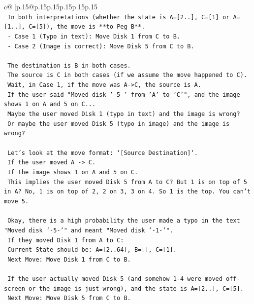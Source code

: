 \documentclass{article}
\begin{document}
{\begin{supertabular}{c@{$\;$}|p{.15\linewidth}@{}p{.15\linewidth}p{.15\linewidth}p{.15\linewidth}p{.15\linewidth}p{.15\linewidth}}
{{{\\ 
\texttt{    In both interpretations (whether the state is A={[}2..{]}, C={[}1{]} or A={[}1..{]}, C={[}5{]}), the move is **to Peg B**.} \\
\texttt{    {-} Case 1 (Typo in text): Move Disk 1 from C to B.} \\
\texttt{    {-} Case 2 (Image is correct): Move Disk 5 from C to B.} \\
\\ 
\texttt{    The destination is B in both cases.} \\
\texttt{    The source is C in both cases (if we assume the move happened to C).} \\
\texttt{    Wait, in Case 1, if the move was A{-}>C, the source is A.} \\
\texttt{    If the user said "Moved disk '{-}5{-}' from 'A' to 'C'", and the image shows 1 on A and 5 on C...} \\
\texttt{    Maybe the user moved Disk 1 (typo in text) and the image is wrong?} \\
\texttt{    Or maybe the user moved Disk 5 (typo in image) and the image is wrong?} \\
\\ 
\texttt{    Let's look at the move format: `{[}Source Destination{]}`.} \\
\texttt{    If the user moved A {-}> C.} \\
\texttt{    If the image shows 1 on A and 5 on C.} \\
\texttt{    This implies the user moved Disk 5 from A to C? But 1 is on top of 5 in A? No, 1 is on top of 2, 2 on 3, 3 on 4. So 1 is the top. You can't move 5.} \\
\\ 
\texttt{    Okay, there is a high probability the user made a typo in the text "Moved disk '{-}5{-}'" and meant "Moved disk '{-}1{-}'".} \\
\texttt{    If they moved Disk 1 from A to C:} \\
\texttt{    Current State should be: A={[}2..64{]}, B={[}{]}, C={[}1{]}.} \\
\texttt{    Next Move: Move Disk 1 from C to B.} \\
\\ 
\texttt{    If the user actually moved Disk 5 (and somehow 1{-}4 were moved off{-}screen or the image is just wrong), and the state is A={[}2..{]}, C={[}5{]}.} \\
\texttt{    Next Move: Move Disk 5 from C to B.} \\
}}}
\end{supertabular}}
\end{document}
